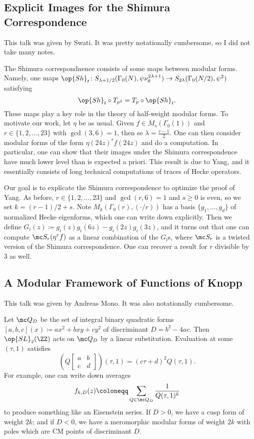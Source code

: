 \documentclass{article}
\begin{document}
\subsection{Explicit Images for the Shimura Correspondence}
This talk was given by Swati. It was pretty notationally cumbersome, so I did not take many notes.

The Shimura correspondnence consists of some maps between modular forms. Namely, one maps $\op{Sh}_t\colon S_{\lambda+1/2}(\Gamma_0(N),\psi\nu_\theta^{2\lambda+1})\to S_{2\lambda}(\Gamma_0(N/2),\psi^2)$ satisfying
\[{\op{Sh}_t}\circ T_{p^2}=T_p\circ{\op{Sh}_t}.\]
These maps play a key role in the theory of half-weight modular forms. To motivate our work, let $\eta$ be as usual. Given $f\in M_s(\Gamma_0(1))$ and $r\in\{1,2,\ldots,23\}$ with $\gcd(3,6)=1$, then se $\lambda=\frac{r-1}2$. One can then consider modular forms of the form $\eta(24z)^rf(24z)$ and do a computation. In particular, one can show that their images under the Shimura correspondence have much lower level than is expected a priori. This result is due to Yang, and it essentially consists of long technical computations of traces of Hecke operators.

Our goal is to explicate the Shimura correspondence to optimize the proof of Yang. As before, $r\in\{1,2,\ldots,23\}$ and $\gcd(r,6)=1$ and $s\ge0$ is even, so we set $k=(r-1)/2+s$. Note $M_k(\Gamma_0(r),(\cdot/r))$ has a basis $\{g_1,\ldots,g_d\}$ of normalized Hecke eigenforms, which one can write down explicitly. Then we define $G_i(z)\coloneqq g_i(z)g_i(6z)-g_i(2z)g_i(3z)$, and it turns out that one can compute $\mc S_r(\eta^r f)$ as a linear combination of the $G_i$s, where $\mc S_r$ is a twisted version of the Shimura correspondence. One can recover a result for $r$ divisible by $3$ as well.

\subsection{A Modular Framework of Functions of Knopp}
This talk was given by Andreas Mono. It was also notationally cumbersome.

Let $\mc Q_D$ be the set of integral binary quadratic forms $[a,b,c](x)\coloneqq ax^2+bxy+cy^2$ of discriminant $D=b^2-4ac$. Then $\op{SL}_2(\ZZ)$ acts on $\mc Q_D$ by a linear substitution. Evaluation at some $(\tau,1)$ satisfies
\[\left(Q\begin{bmatrix}
	a & b \\ c & d
\end{bmatrix}\right)(\tau,1)=(c\tau+d)^2Q(\tau,1).\]
For example, one can write down averages
\[f_{k,D}(z)\coloneqq\sum_{Q\in\mc Q_D}\frac1{Q(\tau,1)^k}\]
to produce something like an Eisenstein series. If $D>0$, we have a cusp form of weight $2k$; and if $D<0$, we have a meromorphic modular forms of weight $2k$ with poles which are CM points of discriminant $D$.
\end{document}
